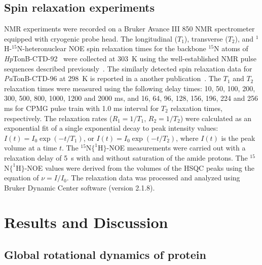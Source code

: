 \documentclass[journal=jpcbfk,manuscript=article]{achemso}
\begin{document}
\subsection{Spin relaxation experiments}
NMR experiments were recorded on a Bruker Avance III 850 NMR spectrometer equipped
with cryogenic probe head. The longitudinal ($T_1$), transverse ($T_2$), and
$^1$H-$^{15}$N-heteronuclear NOE spin relaxation times
for the backbone $^{15}$N atoms of {\it Hp}TonB-CTD-92~\cite{ciragan16}
were collected at 303~K using the well-established NMR pulse sequences described previously~\cite{kay89,barbato92}.
The similarly detected spin relaxation data for {\it Pa}TonB-CTD-96 at 298~K is reported in a another publication~\cite{oeemig17}. 
The $T_1$ and $T_2$ relaxation times were measured using the following delay
times: 10, 50, 100, 200, 300, 500, 800, 1000, 1200 and 2000 ms,
and 16, 64, 96, 128, 156, 196, 224 and 256 ms for CPMG pulse train with 1.0 ms interval
for $T_2$ relaxation times, respectively. The relaxation rates ($R_1=1/T_1$, $R_2=1/T_2$)
were calculated as an exponential fit of a single exponential decay to peak intensity
values: $I(t) = I_0 \exp(-t/T_1)$, or $I(t)=I_0 \exp(-t/T_2)$,
where $I(t)$ is the peak volume at a time $t$. The $^{15}$N$ \{ ^1$H$ \} $-NOE measurements were carried out
with a relaxation delay of 5~s with and without saturation of the amide protons.
The $^{15}$N$ \{ ^1$H$ \} $-NOE values were derived from the volumes of the HSQC peaks using the
equation of $\nu=I/I_0$. The relaxation data was processed and analyzed using
Bruker Dynamic Center software (version 2.1.8).

\section{Results and Discussion}

\subsection{Global rotational dynamics of protein}
\end{document}
